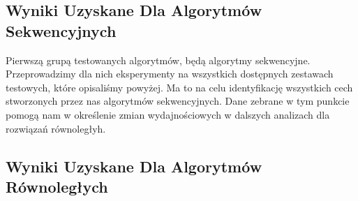 \documentclass{article}
\begin{document}
        \subsection{Wyniki Uzyskane Dla Algorytmów Sekwencyjnych}
            Pierwszą grupą testowanych algorytmów, będą algorytmy sekwencyjne. Przeprowadzimy dla nich eksperymenty na wszystkich dostępnych zestawach testowych, które opisaliśmy powyżej. Ma to na celu identyfikację wszystkich cech stworzonych przez nas algorytmów sekwencyjnych. Dane zebrane w tym punkcie pomogą nam w określenie zmian wydajnościowych w dalszych analizach dla rozwiązań równoległyh.
            
            
        \subsection{Wyniki Uzyskane Dla Algorytmów Równoległych}
            
        
    
    \clearpage
    \printnoidxglossaries
\end{document}
